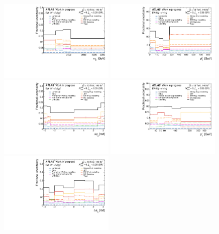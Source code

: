 \begin{figure}[t]
  \centering
  \includegraphics[width=0.49\textwidth]{plots/diffx/uncdiffx/unc_lines_mjj_WIP_12Feb.pdf}
  \includegraphics[width=0.49\textwidth]{plots/diffx/uncdiffx/unc_lines_jj_pt_WIP_12Feb.pdf}
  \includegraphics[width=0.49\textwidth]{plots/diffx/uncdiffx/unc_lines_jj_dphi_WIP_12Feb.pdf}
  \includegraphics[width=0.49\textwidth]{plots/diffx/uncdiffx/unc_lines_lep_pt_WIP_12Feb.pdf}
  \includegraphics[width=0.49\textwidth]{plots/diffx/uncdiffx/unc_lines_lepgam_dphi_WIP_12Feb.pdf}

\end{figure}
